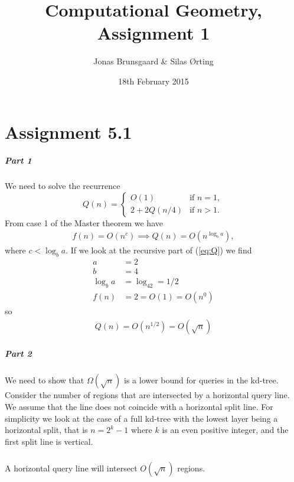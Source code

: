 \documentclass[10pt,a4paper,final,oneside,openany,article]{memoir}
\title{Computational Geometry, Assignment 1}
\author{
    Jonas Brunsgaard \& Silas Ørting
}
\date{18th February 2015}
\newcommand{\twopartdef}[4] {
  \left\{
    \begin{array}{ll}
      #1 & \mbox{if } #2 \\
      {#3} & \mbox{if } #4
    \end{array}
  \right.
}
\begin{document}
\maketitle

\chapter*{Assignment 5.1}

\paragraph{Part 1}
We need to solve the recurrence
\begin{equation}
  \label{eq:Q}
  Q(n) = \twopartdef{O(1)}{n = 1,}{2 + 2Q(n/4)}{n > 1.}
\end{equation}
From case 1 of the Master theorem we have
\begin{align*}
  f(n) = O(n^c) \implies Q(n) = O(n^{\log_ba}),
\end{align*}
where $c < \log_ba$. If we look at the recursive part of (\ref{eq:Q}) we find
\begin{align*}
  a &= 2\\
  b &= 4\\
  \log_ba &= \log_42 = 1/2\\
  f(n) &= 2 = O(1) = O(n^0)
\end{align*}
so 
\begin{align*}
  Q(n) = O(n^{1/2}) = O(\sqrt{n})
\end{align*}

\paragraph{Part 2}
We need to show that $\Omega(\sqrt{n})$ is a lower bound for queries in the kd-tree. Consider the number of regions that are intersected by a horizontal query line. We assume that the line does not coincide with a horizontal split line. For simplicity we look at the case of a full kd-tree with the lowest layer being a horizontal split, that is $n = 2^k - 1$ where $k$ is an even positive integer, and the first split line is vertical.

\paragraph{}
A horizontal query line will intersect $O(\sqrt{n})$ regions. 
\end{document}

